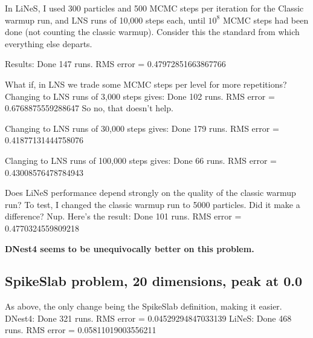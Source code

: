 \documentclass[a4paper, 12pt]{article}
\begin{document}
In LiNeS, I used 300 particles and 500 MCMC steps per iteration
for the Classic warmup run, and
LNS runs of 10,000 steps each, until $10^8$ MCMC steps
had been done (not counting the classic warmup).
Consider this the standard from which everything else
departs.

Results:
Done 147 runs. RMS error = 0.47972851663867766

What if, in LNS we trade some MCMC steps per level
for more repetitions? Changing to LNS runs of
3,000 steps gives:
Done 102 runs. RMS error = 0.6768875559288647
So no, that doesn't help.

Changing to LNS runs of 30,000 steps gives:
Done 179 runs. RMS error = 0.41877131444758076

Clanging to LNS runs of 100,000 steps gives:
Done 66 runs. RMS error = 0.43008576478784943

Does LiNeS performance depend strongly on the quality of the
classic warmup run? To test, I changed the classic warmup run to 5000
particles. Did it make a difference? Nup. Here's the result:
Done 101 runs. RMS error = 0.4770324559809218

{\bf DNest4 seems to be unequivocally better on this problem.}

\subsection{SpikeSlab problem, 20 dimensions, peak at 0.0}
As above, the only change being the SpikeSlab definition, making it
easier.
DNest4: Done 321 runs. RMS error = 0.04529294847033139
LiNeS: Done 468 runs. RMS error = 0.05811019003556211




\end{document}
